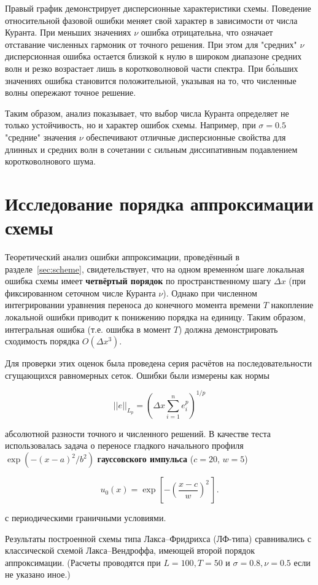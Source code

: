 \documentclass[14pt]{report}
\begin{document}
Правый график демонстрирует дисперсионные характеристики схемы. Поведение относительной фазовой ошибки меняет свой характер в зависимости от числа Куранта. При меньших значениях $\nu$ ошибка отрицательна, что означает отставание численных гармоник от точного решения. При этом для "средних" $\nu$ дисперсионная ошибка остается близкой к нулю в широком диапазоне средних волн и резко возрастает лишь в коротковолновой части спектра. При б\'{о}льших значениях ошибка становится положительной, указывая на то, что численные волны опережают точное решение. 

Таким образом, анализ показывает, что выбор числа Куранта определяет не только устойчивость, но и характер ошибок схемы. Например, при $\sigma = 0.5$ "средние" значения $\nu$ обеспечивают отличные дисперсионные свойства для длинных и средних волн в сочетании с сильным диссипативным подавлением коротковолнового шума.

\chapter{Исследование порядка аппроксимации схемы}
\label{sec:convergence-analysis}

Теоретический анализ ошибки аппроксимации, проведённый в разделе~\ref{sec:scheme}, свидетельствует, что на одном временн\'{о}м шаге локальная ошибка схемы имеет \textbf{четвёртый порядок} по пространственному шагу $\Delta x$ (при фиксированном сеточном числе Куранта $\nu$). Однако при численном интегрировании уравнения переноса до конечного момента времени $T$ накопление локальной ошибки приводит к понижению порядка на единицу. Таким образом, интегральная ошибка (т.е. ошибка в момент $T$) должна демонстрировать сходимость порядка $O(\Delta x^3)$.

Для проверки этих оценок была проведена серия расчётов на последовательности сгущающихся равномерных сеток. Ошибки были измерены как нормы 

$$||e||_{L_p} = (\Delta x\sum_{i = 1}^n {e_i^p})^{1/p}$$

абсолютной разности точного и численного решений. В качестве теста использовалась задача о переносе гладкого начального профиля $\exp(-(x-a)^{2}/b^{2})$ \textbf{гауссовского импульса} ($c=20$, $w=5$)

\[
    u_0(x) = \exp\!\left[-\left(\frac{x-c}{w}\right)^{\!2}\,\right].
\]

с периодическими граничными условиями.

Результаты построенной схемы типа Лакса--Фридрихса (ЛФ-типа) сравнивались с классической схемой Лакса–Вендроффа, имеющей второй порядок аппроксимации. (Расчеты проводятся при $L = 100, T = 50$ и $\sigma = 0.8, \nu = 0.5$ если не указано иное.)
\end{document}
